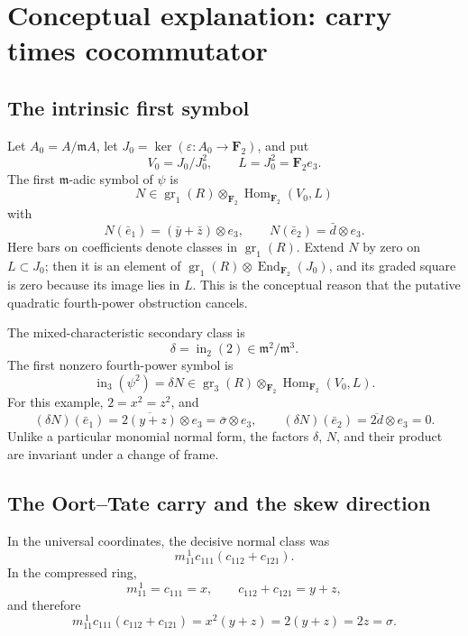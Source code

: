 \documentclass[11pt]{article}
\theoremstyle{remark}
\newcommand{\F}{\mathbf F}
\newcommand{\gr}{\operatorname{gr}}
\newcommand{\eps}{\varepsilon}
\newcommand{\m}{\mathfrak m}
\begin{document}
\section{Conceptual explanation: carry times cocommutator}
\label{sec:conceptual}

\subsection{The intrinsic first symbol}

Let \(A_0=A/\m A\), let \(J_0=\ker(\eps:A_0\to\F_2)\), and put
\[
 V_0=J_0/J_0^2,\qquad L=J_0^2=\F_2e_3.
\]
The first \(\m\)-adic symbol of \(\psi\) is
\[
 N\in\gr_1(R)\otimes_{\F_2}\operatorname{Hom}_{\F_2}(V_0,L)
\]
with
\begin{equation}\label{eq:N}
 N(\bar e_1)=(\bar y+\bar z)\otimes e_3,\qquad
 N(\bar e_2)=\bar d\otimes e_3.
\end{equation}
Here bars on coefficients denote classes in \(\gr_1(R)\).  Extend \(N\) by
zero on \(L\subset J_0\); then it is an element of
\(\gr_1(R)\otimes\operatorname{End}_{\F_2}(J_0)\), and its graded square is
zero because its image lies in \(L\).  This is the conceptual reason that
the putative quadratic fourth-power obstruction cancels.

The mixed-characteristic secondary class is
\[
 \delta=\operatorname{in}_2(2)\in\m^2/\m^3.
\]
The first nonzero fourth-power symbol is
\begin{equation}\label{eq:deltaN}
 \operatorname{in}_3(\psi^2)=\delta N
 \in\gr_3(R)\otimes_{\F_2}\operatorname{Hom}_{\F_2}(V_0,L).
\end{equation}
For this example, \(2=x^2=z^2\), and
\[
 (\delta N)(\bar e_1)=\overline{2(y+z)}\otimes e_3
   =\bar\sigma\otimes e_3,\qquad
 (\delta N)(\bar e_2)=\overline{2d}\otimes e_3=0.
\]
Unlike a particular monomial normal form, the factors \(\delta\), \(N\),
and their product are invariant under a change of frame.

\subsection{The Oort--Tate carry and the skew direction}

In the universal coordinates, the decisive normal class was
\begin{equation}\label{eq:universal-normal-class}
 m_{11}^{\,1}c_{111}(c_{112}+c_{121}).
\end{equation}
In the compressed ring,
\begin{equation}\label{eq:mechanism-one-line}
 m_{11}^{\,1}=c_{111}=x,\qquad
 c_{112}+c_{121}=y+z,
\end{equation}
and therefore
\[
 m_{11}^{\,1}c_{111}(c_{112}+c_{121})
 =x^2(y+z)=2(y+z)=2z=\sigma.
\]
\end{document}
